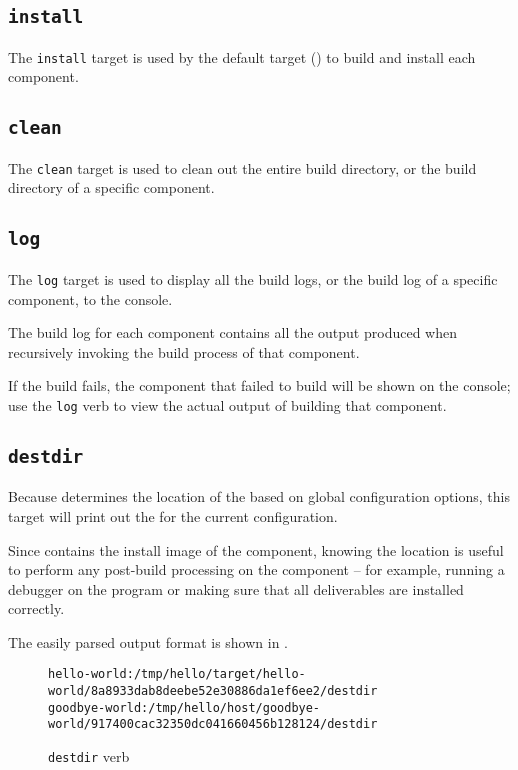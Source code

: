\subsection{\texttt{install}}

The \texttt{install} target is used by the default target
() to build and install each component.

\subsection{\texttt{clean}}

The \texttt{clean} target is used to clean out the entire build
directory, or the build directory of a specific component.

\subsection{\texttt{log}}

The \texttt{log} target is used to display all the build logs, or the
build log of a specific component, to the console.

The build log for each component contains all the output produced when
recursively invoking the build process of that component.

If the build fails, the component that failed to build will be shown
on the console; use the \texttt{log} verb to view the actual output of
building that component.

\subsection{\texttt{destdir}}

Because \lmsbw determines the location of the \destdir based on global
configuration options, this target will print out the \destdir for the
current configuration.

Since \destdir contains the install image of the component, knowing
the \destdir location is useful to perform any post-build processing
on the component -- for example, running a debugger on the program or
making sure that all deliverables are installed correctly.

The easily parsed output format is shown in
.

\begin{figure}[tbh]
\hrulefill
\begin{scriptsize}
\begin{verbatim}
hello-world:/tmp/hello/target/hello-world/8a8933dab8deebe52e30886da1ef6ee2/destdir
goodbye-world:/tmp/hello/host/goodbye-world/917400cac32350dc041660456b128124/destdir
\end{verbatim}
\end{scriptsize}
\hrulefill
\caption{\texttt{destdir} verb}\label{usinglmsbw:destdir-verb}
\end{figure}

